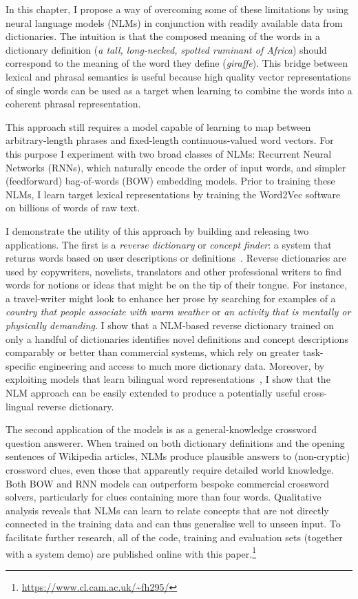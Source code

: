 In this chapter, I propose a way of overcoming some of these limitations by using neural language models (NLMs) in conjunction with readily available data from dictionaries. The intuition is that the composed meaning of the words in a dictionary definition (\emph{a tall, long-necked, spotted ruminant of Africa}) should correspond to the meaning of the word they define (\emph{giraffe}). This bridge between lexical and phrasal semantics is useful because high quality vector representations of single words can be used as a target when learning to combine the words into a coherent phrasal representation.
 
This approach still requires a model capable of learning to map between arbitrary-length phrases and fixed-length continuous-valued word vectors. For this purpose I experiment with two broad classes of NLMs: Recurrent Neural Networks (RNNs), which naturally encode the order of input words, and simpler (feedforward) bag-of-words (BOW) embedding models. Prior to training these NLMs, I learn target lexical representations by training the Word2Vec software~\citep{mikolov2013distributed} on billions of words of raw text. 

I demonstrate the utility of this approach by building and releasing two applications. The first is a \emph{reverse dictionary} or \emph{concept finder}: a system that returns words based on user descriptions or definitions~\citep{zock2004word}. Reverse dictionaries are used by copywriters, novelists, translators and other professional writers to find words for notions or ideas that might be on the tip of their tongue. For instance, a travel-writer might look to enhance her prose by searching for examples of a \emph{country that people associate with warm weather} or \emph{an activity that is mentally or physically demanding}. I show that a NLM-based reverse dictionary trained on only a handful of dictionaries identifies novel definitions and concept descriptions comparably or better than commercial systems, which rely on greater task-specific engineering and access to much more dictionary data. Moreover, by exploiting models that learn bilingual word representations~\citep{307754,Klementiev,hermann2013multilingual,gouws2014bilbowa}, I show that the NLM approach can be easily extended to produce a potentially useful cross-lingual reverse dictionary.

The second application of the models is as a general-knowledge crossword question answerer. When trained on both dictionary definitions and the opening sentences of Wikipedia articles, NLMs produce plausible answers to (non-cryptic) crossword clues, even those that apparently require detailed world knowledge. Both BOW and RNN models can outperform bespoke commercial crossword solvers, particularly for clues containing more than four words. Qualitative analysis reveals that NLMs can learn to relate concepts that are not directly connected in the training data and can thus generalise well to unseen input. To facilitate further research, all of the code, training and evaluation sets (together with a system demo) are published online with this paper.\footnote{
    \url{https://www.cl.cam.ac.uk/~fh295/}
}

